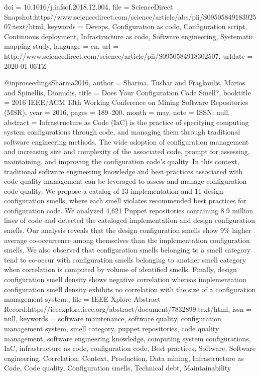 {  doi      = {10.1016/j.infsof.2018.12.004},
  file     = {ScienceDirect Snapshot:https\://www.sciencedirect.com/science/article/abs/pii/S0950584918302507:text/html},
  keywords = {Devops, Configuration as code, Configuration script, Continuous deployment, Infrastructure as code, Software engineering, Systematic mapping study},
  language = {en},
  url      = {http://www.sciencedirect.com/science/article/pii/S0950584918302507},
  urldate  = {2020-01-06TZ}
}

@inproceedings{Sharma2016,
  author    = {Sharma, Tushar and Fragkoulis, Marios and Spinellis, Diomidis},
  title     = {Does {Your} {Configuration} {Code} {Smell}?},
  booktitle = {2016 {IEEE}/{ACM} 13th {Working} {Conference} on {Mining} {Software} {Repositories} ({MSR})},
  year      = {2016},
  pages     = {189--200},
  month     = may,
  note      = {ISSN: null},
  abstract  = {Infrastructure as Code (IaC) is the practice of specifying computing system configurations through code, and managing them through traditional software engineering methods. The wide adoption of configuration management and increasing size and complexity of the associated code, prompt for assessing, maintaining, and improving the configuration code's quality. In this context, traditional software engineering knowledge and best practices associated with code quality management can be leveraged to assess and manage configuration code quality. We propose a catalog of 13 implementation and 11 design configuration smells, where each smell violates recommended best practices for configuration code. We analyzed 4,621 Puppet repositories containing 8.9 million lines of code and detected the cataloged implementation and design configuration smells. Our analysis reveals that the design configuration smells show 9\% higher average co-occurrence among themselves than the implementation configuration smells. We also observed that configuration smells belonging to a smell category tend to co-occur with configuration smells belonging to another smell category when correlation is computed by volume of identified smells. Finally, design configuration smell density shows negative correlation whereas implementation configuration smell density exhibits no correlation with the size of a configuration management system.},
  file      = {IEEE Xplore Abstract Record:https\://ieeexplore.ieee.org/abstract/document/7832899:text/html},
  issn      = {null},
  keywords  = {software maintenance, software quality, configuration management system, smell category, puppet repositories, code quality management, software engineering knowledge, computing system configurations, IaC, infrastructure as code, configuration code, Best practices, Software, Software engineering, Correlation, Context, Production, Data mining, Infrastructure as Code, Code quality, Configuration smells, Technical debt, Maintainability}
}

